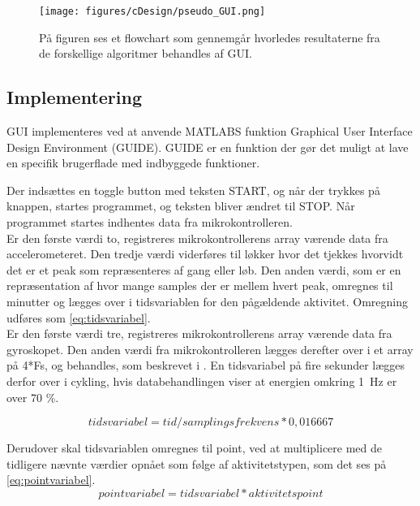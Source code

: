 \begin{figure}[H]
	\centering
	\texttt{[image: figures/cDesign/pseudo\_GUI.png]}
	\caption{På figuren ses et flowchart som gennemgår hvorledes resultaterne fra de forskellige algoritmer behandles af GUI.}
	\label{fig:GUI}
\end{figure}

\subsection{Implementering}
GUI implementeres ved at anvende MATLABS funktion Graphical User Interface Design Environment (GUIDE). GUIDE er en funktion der gør det muligt at lave en specifik brugerflade med indbyggede funktioner.

Der indsættes en toggle button med teksten START, og når der trykkes på knappen, startes programmet, og teksten bliver ændret til STOP. Når programmet startes indhentes data fra mikrokontrolleren. \\
Er den første værdi to, registreres mikrokontrollerens array værende data fra accelerometeret. Den tredje værdi viderføres til løkker hvor det tjekkes hvorvidt det er et peak som repræsenteres af gang eller løb. Den anden værdi, som er en repræsentation af hvor mange samples der er mellem hvert peak, omregnes til minutter og lægges over i tidsvariablen for den pågældende aktivitet. Omregning udføres som \eqref{eq:tidsvariabel}. \\
Er den første værdi tre, registreres mikrokontrollerens array værende data fra gyroskopet. Den anden værdi fra mikrokontrolleren lægges derefter over i et array på 4*Fs, og behandles, som beskrevet i . En tidsvariabel på fire sekunder lægges derfor over i cykling, hvis databehandlingen viser at energien omkring 1~Hz er over 70 \%. 

\begin{equation}
\label{eq:tidsvariabel}
	tidsvariabel = tid/samplingsfrekvens*0,016667
\end{equation}

Derudover skal tidsvariablen omregnes til point, ved at multiplicere med de tidligere nævnte værdier opnået som følge af aktivitetstypen, som det ses på \eqref{eq:pointvariabel}. 
\begin{equation}
\label{eq:pointvariabel}
pointvariabel = tidsvariabel*aktivitetspoint
\end{equation}

